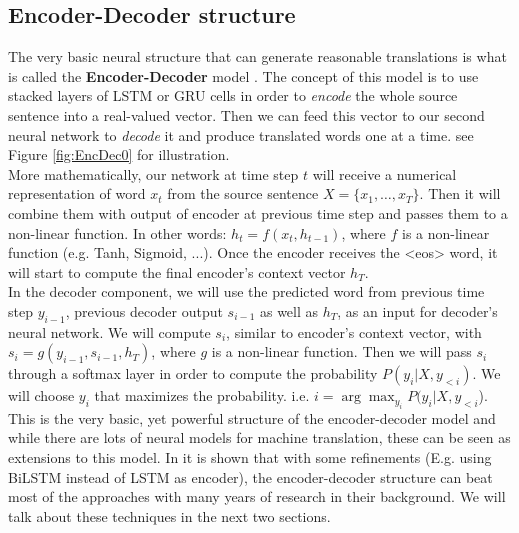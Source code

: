 \documentclass{sfuthesis}
\begin{document}
\subsection{Encoder-Decoder structure} \label{sub:EncDec}
The very basic neural structure that can generate reasonable translations is what is called the \textbf{Encoder-Decoder} model \cite{Chrisman:1991:EncDec, Sutskever:2014:NIPS, cho:2014:emnlp}. The concept of this model is to use stacked layers of LSTM or GRU cells in order to \emph{encode} the whole source sentence into a real-valued vector. Then we can feed this vector to our second neural network to \emph{decode} it and produce translated words one at a time. see Figure \ref{fig:EncDec0} for illustration.\\
More mathematically, our network at time step $t$ will receive a numerical representation of word $x_t$ from the source sentence $X = \{x_1, \dots, x_T\}$. Then it will combine them with output of encoder at previous time step and passes them to a non-linear function. In other words: $h_t = f(x_t, h_{t-1})$, where $f$ is a non-linear function (e.g. Tanh, Sigmoid, ...). Once the encoder receives the <eos> word, it will start to compute the final encoder's context vector $h_T$.\\
In the decoder component, we will use the predicted word from previous time step $y_{i-1}$, previous decoder output $s_{i-1}$ as well as $h_T$, as an input for decoder's neural network. We will compute $s_{i}$, similar to encoder's context vector, with $s_{i} = g(y_{i-1}, s_{i-1}, h_{T})$, where $g$ is a non-linear function. Then we will pass $s_i$ through a softmax layer in order to compute the probability $P(y_i | X, y_{<i})$.  We will choose $y_i$ that maximizes the probability. i.e. $i = \arg\max_{y_i} P(y_i | X, y_{<i}$).\\
This is the very basic, yet powerful structure of the encoder-decoder model and while there are lots of neural models for machine translation, these can be seen as extensions to this model. In \cite{Sutskever:2014:NIPS} it is shown that with some refinements (E.g. using BiLSTM instead of LSTM as encoder), the encoder-decoder structure can beat most of the approaches with many years of research in their background. We will talk about these techniques in the next two sections.
\end{document}
